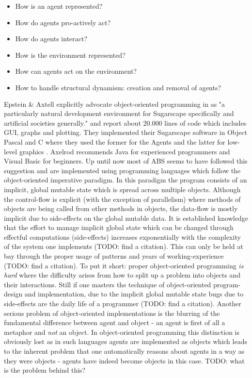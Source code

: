 \begin{itemize}
	\item How is an agent represented?
	\item How do agents pro-actively act?
	\item How do agents interact?
	\item How is the environment represented?
	\item How can agents act on the environment?
	\item How to handle structural dynamism: creation and removal of agents?
\end{itemize}

Epstein \& Axtell explicitly advocate object-oriented programming in \cite{epstein_growing_1996} as "a particularly natural development environment for Sugarscape specifically and artificial societies generally." and report about 20.000 lines of code which includes GUI, graphs and plotting. They implemented their Sugarscape software in Object Pascal and C where they used the former for the Agents and the latter for low-level graphics \cite{axtell_aligning_1996}. Axelrod \cite{axelrod_advancing_1997} recommends Java for experienced programmers and Visual Basic for beginners. Up until now most of ABS seems to have followed this suggestion and are implemented using programming languages which follow the object-oriented imperative paradigm. In this paradigm the program consists of an implicit, global mutable state which is spread across multiple objects. Although the control-flow is explicit (with the exception of parallelism) where methods of objects are being called from other methods in objects, the data-flow is mostly implicit due to side-effects on the global mutable data.
It is established knowledge that the effort to manage implicit global state which can be changed through effectful computations (side-effects) increases exponentially with the complexity of the system one implements (TODO: find a citation). This can only be held at bay through the proper usage of patterns \cite{gamma_design_1994} and years of working-experience (TODO: find a citation). To put it short: proper object-oriented programming \textit{is hard} where the difficulty arises from how to split up a problem into objects and their interactions. Still if one masters the technique of object-oriented program-design and implementation, due to the implicit global mutable state bugs due to side-effects are the daily life of a programmer (TODO: find a citation). Another serious problem of object-oriented implementations is the blurring of the fundamental difference between agent and object - an agent is first of all a metaphor and \textit{not} an object. In object-oriented programming this distinction is obviously lost as in such languages agents are implemented as objects which leads to the inherent problem that one automatically reasons about agents in a way as they were objects - agents have indeed become objects in this case. TODO: what is the problem behind this?

